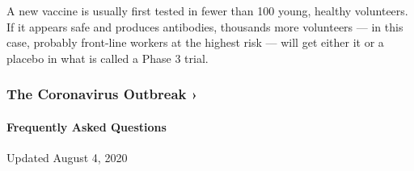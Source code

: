 A new vaccine is usually first tested in fewer than 100 young, healthy
volunteers. If it appears safe and produces antibodies, thousands more
volunteers --- in this case, probably front-line workers at the highest
risk --- will get either it or a placebo in what is called a Phase 3
trial.

\href{https://www.nytimes.com/news-event/coronavirus?action=click\&pgtype=Article\&state=default\&region=MAIN_CONTENT_3\&context=storylines_faq}{}

\hypertarget{the-coronavirus-outbreak-}{%
\subsubsection{The Coronavirus Outbreak
›}\label{the-coronavirus-outbreak-}}

\hypertarget{frequently-asked-questions}{%
\paragraph{Frequently Asked
Questions}\label{frequently-asked-questions}}

Updated August 4, 2020


